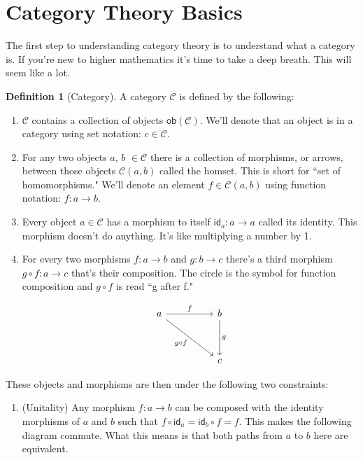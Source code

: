 \documentclass[12pt]{article}
\theoremstyle{definition}
\newtheorem{definition}{Definition}
\begin{document}
\pagebreak
\section*{Category Theory Basics}
The first step to understanding category theory is to understand what a category is.
If you're new to higher mathematics it's time to take a deep breath.
This will seem like a lot.

\begin{definition}[Category]
    A category $\mathcal{C}$ is defined by the following:
    \begin{enumerate}
        \item $\mathcal{C}$ contains a collection of objects $\mathsf{ob}(\mathcal{C})$. We'll denote that an object is in a category using set notation: $c\in\mathcal{C}$.
        \item For any two objects $a$, $b$ $\in \mathcal{C}$ there is a collection of morphisms, or arrows, between those objects $\mathcal{C}(a,b)$ called the homset. This is short for ``set of homomorphisms." We'll denote an element $f\in\mathcal{C}(a,b)$ using function notation: $f:a\rightarrow b$.
        \item Every object $a\in \mathcal{C}$ has a morphism to itself $\mathsf{id}_a:a\rightarrow a$ called its identity. This morphism doesn't do anything. It's like multiplying a number by 1.
        \item For every two morphisms $f:a\rightarrow b$ and $g: b\rightarrow c$ there's a third morphism $g\circ f:a\rightarrow c$ that's their composition. The circle is the symbol for function composition and $g \circ f$ is read ``g after f."

              \[\begin{tikzcd}
                      a && b \\
                      \\
                      && c
                      \arrow["f", from=1-1, to=1-3]
                      \arrow["g", from=1-3, to=3-3]
                      \arrow["{g\circ f}"', from=1-1, to=3-3]
                  \end{tikzcd}\]

    \end{enumerate}
    These objects and morphisms are then under the following two constraints:
    \begin{enumerate}
        \item (Unitality) Any morphism $f:a\rightarrow b$ can be composed with the identity morphisms of $a$ and $b$ such that $f\circ \mathsf{id}_a=\mathsf{id}_b\circ f=f$. This makes the following diagram commute. What this means is that both paths from $a$ to $b$ here are equivalent.


\end{enumerate}
\end{definition}
\end{document}
